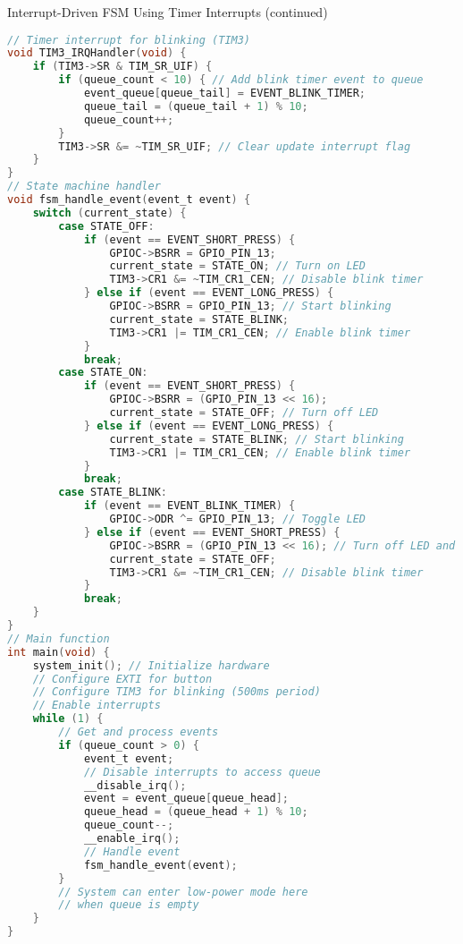 \begin{example2}{Interrupt-Driven FSM Using Timer Interrupts (continued)}
\begin{lstlisting}[language=C, style=basesmol]
// Timer interrupt for blinking (TIM3)
void TIM3_IRQHandler(void) {
    if (TIM3->SR & TIM_SR_UIF) {
        if (queue_count < 10) { // Add blink timer event to queue
            event_queue[queue_tail] = EVENT_BLINK_TIMER;
            queue_tail = (queue_tail + 1) % 10;
            queue_count++;
        }
        TIM3->SR &= ~TIM_SR_UIF; // Clear update interrupt flag
    }
}
// State machine handler
void fsm_handle_event(event_t event) {
    switch (current_state) {
        case STATE_OFF:
            if (event == EVENT_SHORT_PRESS) {
                GPIOC->BSRR = GPIO_PIN_13;
                current_state = STATE_ON; // Turn on LED
                TIM3->CR1 &= ~TIM_CR1_CEN; // Disable blink timer
            } else if (event == EVENT_LONG_PRESS) {
                GPIOC->BSRR = GPIO_PIN_13; // Start blinking
                current_state = STATE_BLINK;
                TIM3->CR1 |= TIM_CR1_CEN; // Enable blink timer
            }
            break;
        case STATE_ON:
            if (event == EVENT_SHORT_PRESS) {
                GPIOC->BSRR = (GPIO_PIN_13 << 16); 
                current_state = STATE_OFF; // Turn off LED
            } else if (event == EVENT_LONG_PRESS) {
                current_state = STATE_BLINK; // Start blinking
                TIM3->CR1 |= TIM_CR1_CEN; // Enable blink timer
            }
            break;
        case STATE_BLINK:
            if (event == EVENT_BLINK_TIMER) {
                GPIOC->ODR ^= GPIO_PIN_13; // Toggle LED
            } else if (event == EVENT_SHORT_PRESS) {
                GPIOC->BSRR = (GPIO_PIN_13 << 16); // Turn off LED and blinking
                current_state = STATE_OFF;
                TIM3->CR1 &= ~TIM_CR1_CEN; // Disable blink timer
            }
            break;
    }
}
// Main function
int main(void) {
    system_init(); // Initialize hardware
    // Configure EXTI for button
    // Configure TIM3 for blinking (500ms period)
    // Enable interrupts
    while (1) {
        // Get and process events
        if (queue_count > 0) {
            event_t event;
            // Disable interrupts to access queue
            __disable_irq();
            event = event_queue[queue_head];
            queue_head = (queue_head + 1) % 10;
            queue_count--;
            __enable_irq();
            // Handle event
            fsm_handle_event(event);
        }
        // System can enter low-power mode here
        // when queue is empty
    }
}
\end{lstlisting}
\end{example2}

